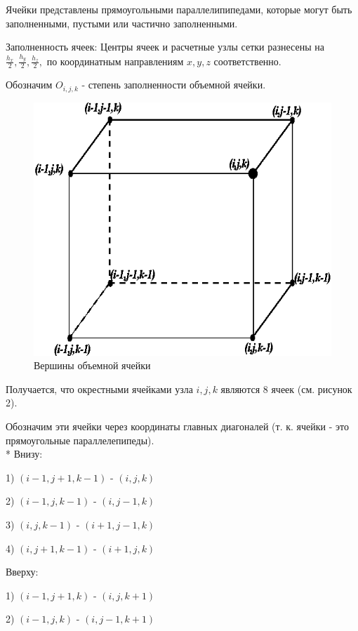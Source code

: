 \documentclass[12pt]{article}
\begin{document}
Ячейки представлены прямоугольными параллелипипедами, которые могут быть заполненными, пустыми или частично заполненными. 

Заполненность ячеек:
Центры ячеек и расчетные узлы сетки разнесены на $ \frac{h_x}{2}, \frac{h_y}{2}, \frac{h_z}{2}, $ по координатным направлениям $x, y, z$ соответственно.

Обозначим $O_{i,j,k}$ - степень заполненности объемной ячейки. 

\begin{figure}[h!]
	\centering
	\includegraphics {figs/ris3}
	\caption{ Вершины объемной ячейки}
\end{figure}


Получается, что окрестными ячейками узла ${i,j,k}$ являются 8 ячеек (см. рисунок 2).

Обозначим эти ячейки через координаты главных диагоналей (т. к. ячейки - это прямоугольные параллелепипеды).
\\*
\newpage
Внизу:

1) ${(i-1,j+1,k-1)}$ - ${(i,j,k)}$ 

2) ${(i-1,j,k-1)}$ - ${(i,j-1,k)}$ 

3) ${(i,j,k-1)}$ - ${(i+1,j-1,k)}$ 

4) ${(i,j+1,k-1)}$ - ${(i+1,j,k)}$ 

Вверху:

1) ${(i-1,j+1,k)}$ - ${(i,j,k+1)}$ 

2) ${(i-1,j,k)}$ - ${(i,j-1,k+1)}$ 
\end{document}
